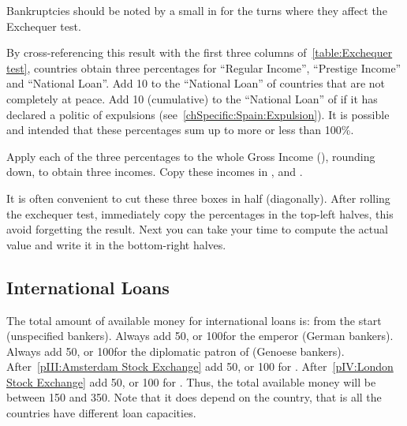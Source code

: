 \begin{playtip}
  Bankruptcies should be noted by a small \textetoile in  for the turns where they affect the Exchequer test.
\end{playtip}

\aparag[Percentages] By cross-referencing this result with the first three
columns of~\ref{table:Exchequer test}, countries obtain three percentages for
``Regular Income'', ``Prestige Income'' and ``National Loan''.
\bparag Add 10 to the ``National Loan'' of countries that are not completely
at peace.
\bparag Add 10 (cumulative) to the ``National Loan'' of \HIS if it has
declared a politic of expulsions (see~\ref{chSpecific:Spain:Expulsion}).
\bparag It is possible and intended that these percentages sum up to more or
less than 100\%.

\aparag[Incomes] Apply each of the three percentages to the whole Gross Income
(), rounding down, to obtain three incomes.
\bparag Copy these incomes in ,
 and .

\begin{playtip}
  It is often convenient to cut these three boxes in half (diagonally). After
  rolling the exchequer test, immediately copy the percentages in the top-left
  halves, this avoid forgetting the result. Next you can take your time to
  compute the actual value and write it in the bottom-right halves.
\end{playtip}


\subsection{International Loans}\label{chPeace:International loans}
 The total amount of available money for international
loans is:
\ducats from the start (unspecified bankers).
\bparag Always add 50\ducats, or 100\ducats for the emperor (German bankers).
\bparag Always add 50\ducats, or 100\ducats for the diplomatic patron of
\paysGenes (Genoese bankers).
\bparag After~\ref{pIII:Amsterdam Stock Exchange} add 50\ducats, or 100\ducats
for \HOL.
\bparag After~\ref{pIV:London Stock Exchange} add 50\ducats, or 100\ducats
for \ANG.
\bparag Thus, the total available money will be between 150 and
350\ducats. Note that it does depend on the country, that is all the countries
have different loan capacities.

